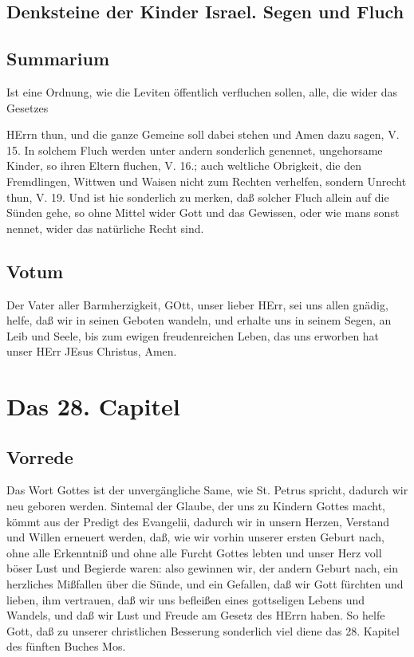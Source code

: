 \section{Denksteine der Kinder Israel. Segen und Fluch}

\section{Summarium}

Ist eine Ordnung, wie die Leviten öffentlich verfluchen sollen, alle, die wider das Gesetzes


HErrn thun, und die ganze Gemeine soll dabei stehen und Amen dazu sagen, V. 15. In solchem Fluch werden unter andern sonderlich genennet, ungehorsame Kinder, so ihren Eltern fluchen, V. 16.; auch weltliche Obrigkeit, die den Fremdlingen, Wittwen und Waisen nicht zum Rechten verhelfen, sondern Unrecht thun, V. 19. Und ist hie sonderlich zu merken, daß solcher Fluch allein auf die Sünden gehe, so ohne Mittel wider Gott und das Gewissen, oder wie mans sonst nennet, wider das natürliche Recht sind.

\section{Votum}

Der Vater aller Barmherzigkeit, GOtt, unser lieber HErr, sei uns allen gnädig, helfe, daß wir in seinen Geboten wandeln, und erhalte uns in seinem Segen, an Leib und Seele, bis zum ewigen freudenreichen Leben, das uns erworben hat unser HErr JEsus Christus, Amen.

\chapter{Das 28. Capitel}

\section{Vorrede}

Das Wort Gottes ist der unvergängliche Same, wie St. Petrus spricht, dadurch wir neu geboren werden. Sintemal der Glaube, der uns zu Kindern Gottes macht, kömmt aus der Predigt des Evangelii, dadurch wir in unsern Herzen, Verstand und Willen erneuert werden, daß, wie wir vorhin unserer ersten Geburt nach, ohne alle Erkenntniß und ohne alle Furcht Gottes lebten und unser Herz voll böser Lust und Begierde waren: also gewinnen wir, der andern Geburt nach, ein herzliches Mißfallen über die Sünde, und ein Gefallen, daß wir Gott fürchten und lieben, ihm vertrauen, daß wir uns befleißen eines gottseligen Lebens und Wandels, und daß wir Lust und Freude am Gesetz des HErrn haben. So helfe Gott, daß zu unserer christlichen Besserung sonderlich viel diene das 28. Kapitel des fünften Buches Mos.

